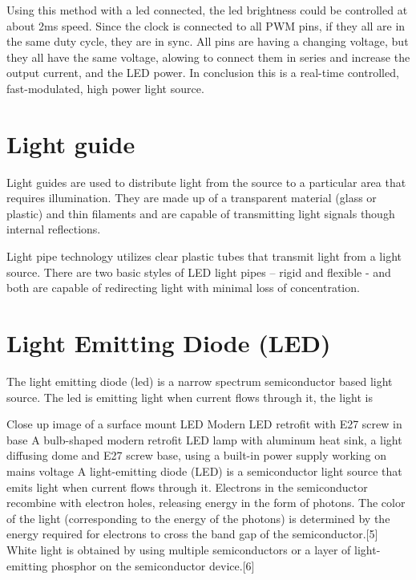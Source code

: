 \documentclass[\main/master.tex]{subfiles}
\begin{document}
\par
Using this method with a led connected, the led brightness could be controlled at about 2ms speed. Since the clock is connected to all PWM pins, if they all are in the same duty cycle, they are in sync. All pins are having a changing voltage, but they all have the same voltage, alowing to connect them in series and increase the output current, and the LED power. In conclusion this is a real-time controlled, fast-modulated, high power light source. 
\section{Light guide}

\color{blue}
\par
Light guides are used to distribute light from the source to a particular area that requires illumination. They are made up of a transparent material (glass or plastic) and thin filaments and are capable of transmitting light signals though internal reflections.  

Light pipe technology utilizes clear plastic tubes that transmit light from a light source. There are two basic styles of LED light pipes – rigid and flexible - and both are capable of redirecting light with minimal loss of concentration.

\section{Light Emitting Diode (LED)}
The light emitting diode (led) is a narrow spectrum semiconductor based light source. The led is emitting light when current flows through it, the light is 
\color{blue}
\par


Close up image of a surface mount LED
Modern LED retrofit with E27 screw in base
A bulb-shaped modern retrofit LED lamp with aluminum heat sink, a light diffusing dome and E27 screw base, using a built-in power supply working on mains voltage
A light-emitting diode (LED) is a semiconductor light source that emits light when current flows through it. Electrons in the semiconductor recombine with electron holes, releasing energy in the form of photons. The color of the light (corresponding to the energy of the photons) is determined by the energy required for electrons to cross the band gap of the semiconductor.[5] White light is obtained by using multiple semiconductors or a layer of light-emitting phosphor on the semiconductor device.[6]
\end{document}
